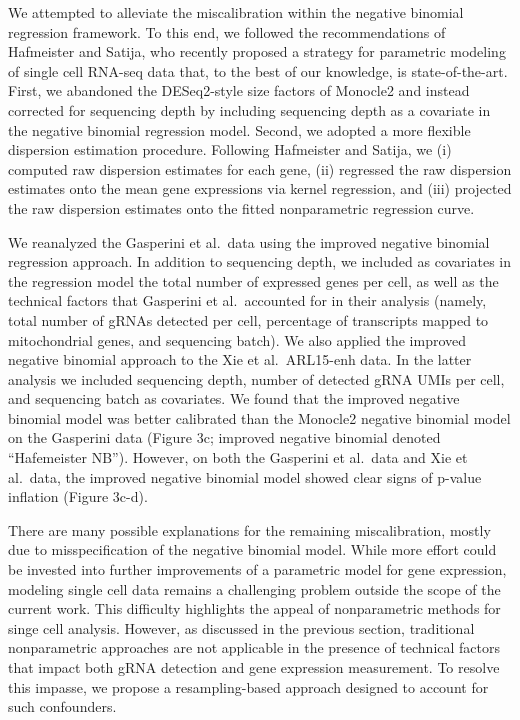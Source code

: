 \documentclass{nature}
\begin{document}
We attempted to alleviate the miscalibration within the negative binomial regression framework. To this end, we followed the recommendations of Hafmeister and Satija, who recently proposed a strategy for parametric modeling of single cell RNA-seq data that, to the best of our knowledge, is state-of-the-art.\cite{Hafemeister2019}  First, we abandoned the DESeq2-style size factors of Monocle2 and instead corrected for sequencing depth by including sequencing depth as a covariate in the negative binomial regression model. Second, we adopted a more flexible dispersion estimation procedure. Following Hafmeister and Satija, we (i) computed raw dispersion estimates for each gene, (ii) regressed the raw dispersion estimates onto the mean gene expressions via kernel regression, and (iii) projected the raw dispersion estimates onto the fitted nonparametric regression curve.

We reanalyzed the Gasperini et al.\ data using the improved negative binomial regression approach. In addition to sequencing depth, we included as covariates in the regression model the total number of expressed genes per cell, as well as the technical factors that Gasperini et al.\ accounted for in their analysis (namely, total number of gRNAs detected per cell, percentage of transcripts mapped to mitochondrial genes, and sequencing batch). We also applied the improved negative binomial approach to the Xie et al.\ ARL15-enh data. In the latter analysis we included sequencing depth, number of detected gRNA UMIs per cell, and sequencing batch as covariates. We found that the improved negative binomial model was better calibrated than the Monocle2 negative binomial model on the Gasperini data (Figure 3c; improved negative binomial denoted ``Hafemeister NB''). However, on both the Gasperini et al.\ data and Xie et al.\ data, the improved negative binomial model showed clear signs of p-value inflation (Figure 3c-d).

There are many possible explanations for the remaining miscalibration, mostly due to misspecification of the negative binomial model. While more effort could be invested into further improvements of a parametric model for gene expression, modeling single cell data remains a challenging problem outside the scope of the current work. This difficulty highlights the appeal of nonparametric methods for singe cell analysis.\cite{Zhu2019} However, as discussed in the previous section, traditional nonparametric approaches are not applicable in the presence of technical factors that impact both gRNA detection and gene expression measurement. To resolve this impasse, we propose a resampling-based approach designed to account for such confounders.
\end{document}
